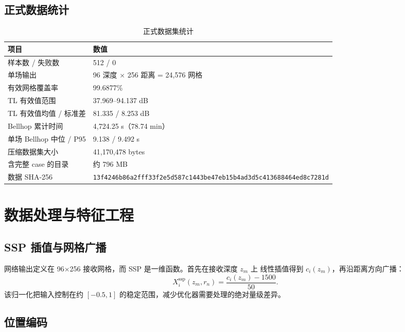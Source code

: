 \documentclass[UTF8,12pt,openany]{ctexrep}
\begin{document}
\section{正式数据统计}

\begin{table}[H]
\centering
\caption{正式数据集统计}
\begin{tabularx}{\textwidth}{L{5.1cm}Y}
\toprule
项目 & 数值 \\
\midrule
样本数 / 失败数 & 512 / 0 \\
单场输出 & 96 深度 $\times$ 256 距离 = 24,576 网格 \\
有效网格覆盖率 & 99.6877\% \\
TL 有效值范围 & 37.969--94.137 dB \\
TL 有效值均值 / 标准差 & 81.335 / 8.253 dB \\
Bellhop 累计时间 & 4,724.25 s（78.74 min） \\
单场 Bellhop 中位 / P95 & 9.138 / 9.492 s \\
压缩数据集大小 & 41,170,478 bytes \\
含完整 case 的目录 & 约 796 MB \\
数据 SHA-256 & \footnotesize\nolinkurl{13f4246b86a2fff33f2e5d587c1443be47eb15b4ad3d5c413688464ed8c7281d} \\
\bottomrule
\end{tabularx}
\end{table}

\chapter{数据处理与特征工程}
\label{chap:processing}

\section{SSP 插值与网格广播}

网络输出定义在 96$\times$256 接收网格，而 SSP 是一维函数。首先在接收深度 $z_m$ 上
线性插值得到 $c_i(z_m)$，再沿距离方向广播：
\begin{equation}
  X^{\mathrm{ssp}}_i(z_m,r_n)=\frac{c_i(z_m)-1500}{50}.
\end{equation}
该归一化把输入控制在约 $[-0.5,1]$ 的稳定范围，减少优化器需要处理的绝对量级差异。

\section{位置编码}
\end{document}
